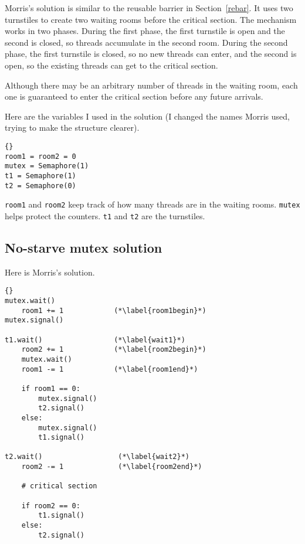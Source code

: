 \documentclass{book}
\newcommand{\clearemptydoublepage}{\newpage\cleardoublepage}
\begin{document}
Morris's solution is similar to the reusable barrier in
Section~\ref{rebar}.  It uses two turnstiles to create two waiting
rooms before the critical section.  The mechanism works in two phases.
During the first phase, the first turnstile is open and the second is
closed, so threads accumulate in the second room.  During the second
phase, the first turnstile is closed, so no new threads can enter, and
the second is open, so the existing threads can get to the critical
section.

Although there may be an arbitrary number of threads in the waiting
room, each one is guaranteed to enter the critical section before any
future arrivals.

Here are the variables I used in the solution (I changed the
names Morris used, trying to make the structure clearer).

\begin{lstlisting}[title={No-starve mutex hint}]{}
room1 = room2 = 0
mutex = Semaphore(1)
t1 = Semaphore(1)
t2 = Semaphore(0)
\end{lstlisting}

{\tt room1} and {\tt room2} keep track of how many threads are in the
waiting rooms.  {\tt mutex} helps protect the counters.  {\tt t1} and
{\tt t2} are the turnstiles.


\clearemptydoublepage
\subsection{No-starve mutex solution}

Here is Morris's solution.

\begin{lstlisting}[title={Morris's algorithm}]{}
mutex.wait()
    room1 += 1            (*\label{room1begin}*)
mutex.signal()

t1.wait()                 (*\label{wait1}*)
    room2 += 1            (*\label{room2begin}*)
    mutex.wait()
    room1 -= 1            (*\label{room1end}*)

    if room1 == 0:
        mutex.signal()
        t2.signal()
    else:
        mutex.signal()
        t1.signal()

t2.wait()                  (*\label{wait2}*)
    room2 -= 1             (*\label{room2end}*)

    # critical section

    if room2 == 0:
        t1.signal()
    else:
        t2.signal()
\end{lstlisting}
\end{document}
